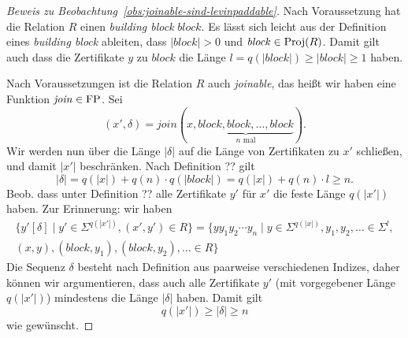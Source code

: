 \begin{proof}[Beweis zu Beobachtung~\ref{obs:joinable-sind-levinpaddable}]
    \strut{}
    Nach Voraussetzung hat  die Relation $R$ einen \emph{building block} $\mathit{block}$. Es lässt sich leicht aus der Definition eines \emph{building block} ableiten, dass $|\mathit{block}|>0$ und $\mathit{block}\in\operatorname{Proj}(R)$. Damit gilt auch dass die Zertifikate $y$ zu $\mathit{block}$ die Länge $l=q(|\mathit{block}|)\geq |\mathit{block}|\geq 1$ haben.

    Nach Voraussetzungen  ist die Relation $R$ auch \emph{joinable}, das heißt wir haben eine Funktion $\mathit{join}\in\mathrm{FP}$. Sei 
    \[ (x',\delta)=\mathit{join}(x, \underbrace{\mathit{block}, \mathit{block}, \ldots, \mathit{block}}_{\text{$n$ mal}}).\]
    Wir werden nun über die Länge $|\delta|$ auf die Länge von Zertifikaten zu $x'$ schließen, und damit $|x'|$ beschränken.
    Nach Definition ?? gilt
    \[ |\delta|=q(|x|)+q(n)\cdot q(|\mathit{block}|)=q(|x|)+q(n)\cdot l\geq n. \]
    Beob. dass unter Definition ?? alle Zertifikate $y'$ für $x'$ die feste Länge $q(|x'|)$ haben. 
    Zur Erinnerung: wir haben
    \begin{multline}\label{eq:levinpad-join} \{ y'[\delta] \mid y'\in\Sigma^{q(|x'|)}, (x', y')\in R \} = \{ yy_1y_2\cdots y_{n} \mid y\in\Sigma^{q(|x|)}, y_1,y_2, \ldots \in \Sigma^{l},\\ (x,y),(\mathit{block}, y_1),(\mathit{block}, y_2), \ldots \in R\} \end{multline}
    Die Sequenz $\delta$ besteht nach Definition aus paarweise verschiedenen Indizes, daher können wir argumentieren, dass auch alle Zertifikate $y'$ (mit vorgegebener Länge $q(|x'|)$) mindestens die Länge $|\delta|$ haben.
    Damit gilt
    \[ q(|x'|) \geq |\delta| \geq n \]
    wie gewünscht.


\end{proof}
